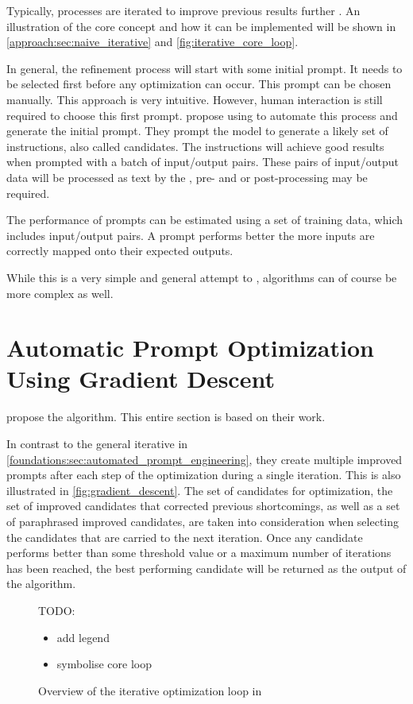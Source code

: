 Typically, \APE processes are iterated to improve previous results further \citeiterative. An illustration of the core concept and how it can be implemented will be shown in \autoref{approach:sec:naive_iterative} and \autoref{fig:iterative_core_loop}.

In general, the refinement process will start with some initial prompt. It needs to be selected first before any optimization can occur. This prompt can be chosen manually. This approach is very intuitive. However, human interaction is still required to choose this first prompt. 
 propose using \LLMs to automate this process and generate the initial prompt. They prompt the model to generate a likely set of instructions, also called candidates. The instructions will achieve good results when prompted with a batch of input/output pairs. These pairs of input/output data will be processed as text by the \LLM, pre- and or post-processing may be required.

The performance of prompts can be estimated using a set of training data, which includes input/output pairs. A prompt performs better the more inputs are correctly mapped onto their expected outputs.

While this is a very simple and general attempt to \APE, algorithms can of course be more complex as well.


\section{Automatic Prompt Optimization Using Gradient Descent}
\label{sec:gradient_descent}
 propose the \ProTeGi algorithm. This entire section is based on their work.

In contrast to the general iterative \APE in \autoref{foundations:sec:automated_prompt_engineering}, they create multiple improved prompts after each step of the optimization during a single iteration. This is also illustrated in \autoref{fig:gradient_descent}. The set of candidates for optimization, the set of improved candidates that corrected previous shortcomings, as well as a set of paraphrased improved candidates, are taken into consideration when selecting the candidates that are carried to the next iteration. 
Once any candidate performs better than some threshold value or a maximum number of iterations has been reached, the best performing candidate will be returned as the output of the \ProTeGi algorithm.

\begin{figure}
\centering

\caption{Overview of the iterative optimization loop in~\cite{pryzant2023AutomaticPrompt}}
\label{fig:gradient_descent}
TODO: 
\begin{itemize}
    \item add legend
    \item symbolise core loop
\end{itemize}
\end{figure}

